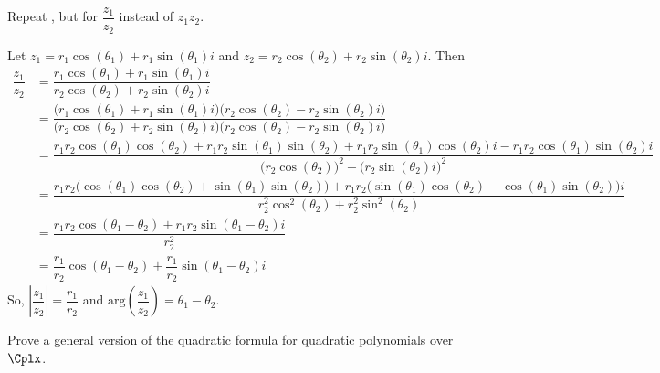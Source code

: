 \begin{chapex}
\label{cqModulusArgumentOfQuotient}
\label{cqModulusArgumentEnd}
Repeat , but for $\dfrac{z_1}{z_2}$ instead of $z_1z_2$.
\end{chapex}

\begin{myproof}
    Let $z_1 = r_1\cos(\theta_1) + r_1\sin(\theta_1) i$ and $z_2 = r_2\cos(\theta_2) + r_2\sin(\theta_2) i$. Then
    \begin{align*}
        \dfrac{z_1}{z_2} &= \dfrac{r_1\cos(\theta_1) + r_1\sin(\theta_1) i}{r_2\cos(\theta_2) + r_2\sin(\theta_2) i}\\
        &= \dfrac{\big(r_1\cos(\theta_1) + r_1\sin(\theta_1) i\big)\big(r_2\cos(\theta_2) - r_2\sin(\theta_2) i\big)}{\big(r_2\cos(\theta_2) + r_2\sin(\theta_2) i\big)\big(r_2\cos(\theta_2) - r_2\sin(\theta_2) i\big)}\\
        &= \dfrac{r_1r_2\cos(\theta_1)\cos(\theta_2) + r_1r_2\sin(\theta_1)\sin(\theta_2) + r_1r_2\sin(\theta_1)\cos(\theta_2) i - r_1r_2\cos(\theta_1)\sin(\theta_2) i }{\big(r_2\cos(\theta_2)\big)^2 - \big(r_2\sin(\theta_2)i\big)^2}\\
        &= \dfrac{r_1r_2\big(\cos(\theta_1)\cos(\theta_2) + \sin(\theta_1)\sin(\theta_2)\big) + r_1r_2\big(\sin(\theta_1)\cos(\theta_2)-\cos(\theta_1)\sin(\theta_2)\big) i}{r_2^2\cos^2(\theta_2) + r_2^2\sin^2(\theta_2)}\\
        &= \dfrac{r_1r_2\cos(\theta_1-\theta_2) + r_1r_2\sin(\theta_1-\theta_2) i}{r_2^2}\\
        &= \dfrac{r_1}{r_2}\cos(\theta_1-\theta_2) + \dfrac{r_1}{r_2}\sin(\theta_1-\theta_2) i
    \end{align*}
    So, $\left|\dfrac{z_1}{z_2}\right| = \dfrac{r_1}{r_2}$ and $\mathrm{arg}\left(\dfrac{z_1}{z_2}\right) = \theta_1-\theta_2$.
\end{myproof}

\begin{chapex}
\label{cqQuadraticFormulaOverC}
Prove a general version of the quadratic formula for quadratic polynomials over $\Cplx$.
\end{chapex}

